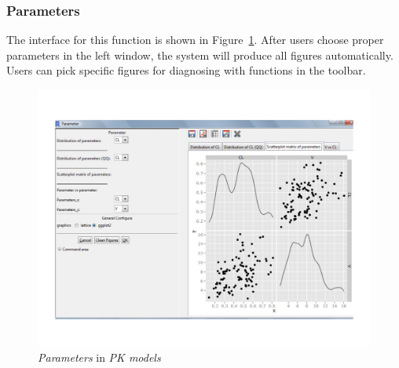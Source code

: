 \documentclass[a4paper]{article}
\begin{document}
\subsubsection{Parameters}
The interface for this function is shown in Figure~\ref{pkmodel_para}. After users choose proper parameters in the left window, the system will produce all figures automatically. Users can pick specific figures for diagnosing with functions in the toolbar.\begin{figure}[h!tb] \centering
\includegraphics[scale=0.6]{pkmodel_para.pdf}
\caption{\textit{Parameters} in \textit{PK models}}
\label{pkmodel_para}
\end{figure}
\end{document}
